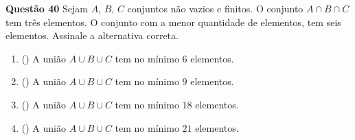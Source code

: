 {\bf Questão 40}
 Sejam $A$, $B$, $C$ conjuntos não vazios e finitos. O conjunto $A\cap B\cap C$ tem três elementos.
 O conjunto com a menor quantidade de elementos, tem seis elementos. Assinale a alternativa correta.

\begin{enumerate}
 \item () A união $A\cup B\cup C$ tem no mínimo $6$ elementos.
 \item () A união $A\cup B\cup C$ tem no mínimo $9$ elementos.
 \item () A união $A\cup B\cup C$ tem no mínimo $18$ elementos.
 \item () A união $A\cup B\cup C$ tem no mínimo $21$ elementos.
\end{enumerate}
